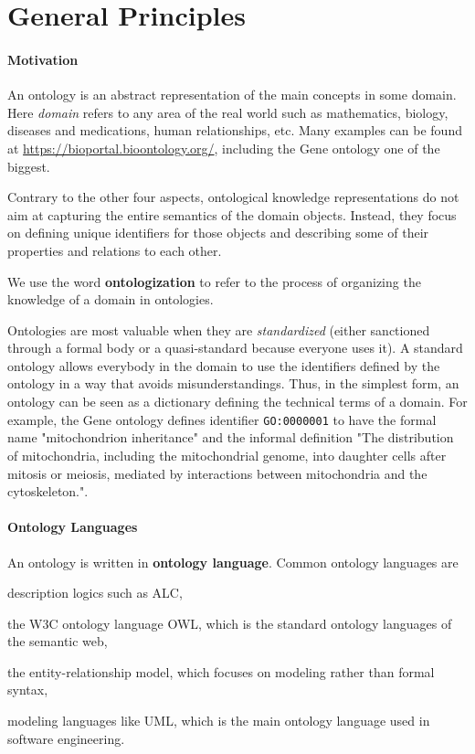 \section{General Principles}\label{sec:onto:principles}

\paragraph{Motivation}
An ontology is an abstract representation of the main concepts in some domain.
Here \emph{domain} refers to any area of the real world such as mathematics, biology, diseases and medications, human relationships, etc.
Many examples can be found at \url{https://bioportal.bioontology.org/}, including the Gene ontology one of the biggest.

Contrary to the other four aspects, ontological knowledge representations do not aim at capturing the entire semantics of the domain objects.
Instead, they focus on defining unique identifiers for those objects and describing some of their properties and relations to each other.

We use the word \textbf{ontologization} to refer to the process of organizing the knowledge of a domain in ontologies.

Ontologies are most valuable when they are \emph{standardized} (either sanctioned through a formal body or a quasi-standard because everyone uses it).
A standard ontology allows everybody in the domain to use the identifiers defined by the ontology in a way that avoids misunderstandings.
Thus, in the simplest form, an ontology can be seen as a dictionary defining the technical terms of a domain.
For example, the Gene ontology defines identifier \texttt{GO:0000001} to have the formal name "mitochondrion inheritance" and the informal definition "The distribution of mitochondria, including the mitochondrial genome, into daughter cells after mitosis or meiosis, mediated by interactions between mitochondria and the cytoskeleton.".

\paragraph{Ontology Languages}
An ontology is written in \textbf{ontology language}.
Common ontology languages are
\begin{compactitem}
 \item description logics such as ALC,
 \item the W3C ontology language OWL, which is the standard ontology languages of the semantic web,
 \item the entity-relationship model, which focuses on modeling rather than formal syntax,
 \item modeling languages like UML, which is the main ontology language used in software engineering.
\end{compactitem}

